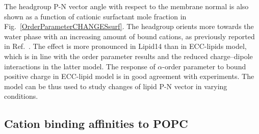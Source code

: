\documentclass[aip,jcp,twocolumn]{revtex4}
\begin{document}
The headgroup P-N vector angle with respect to the membrane normal
is also shown as a function of cationic surfactant mole fraction
in Fig.~\ref{OrderParameterCHANGESsurf}.
The headgroup orients more towards the water phase with an increasing
amount of bound cations, as previously reported in Ref.~. 
The effect is more pronounced in Lipid14 than 
in ECC-lipids model, which is in line with the order parameter 
results and the reduced charge--dipole interactions in the latter model.
The response of $\alpha$-order parameter to bound positive charge
in ECC-lipid model is in good agreement with experiments.
The model can be thus used to study changes of lipid P-N vector
in varying conditions.

%
%


\subsection{Cation binding affinities to POPC}
\end{document}
